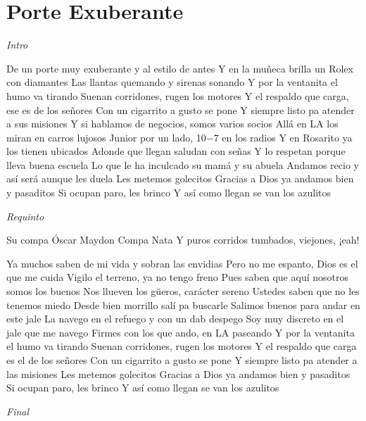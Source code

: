 \section{Porte Exuberante}

\noindent
\vspace{1cm}

\begin{guitar}
	\begin{multicols}{2}

		\textit{Intro}\par

De un porte muy exuberante y al estilo de antes
Y en la muñeca brilla un Rolex con diamantes
Las llantas quemando y sirenas sonando
Y por la ventanita el humo va tirando
Suenan corridones, rugen los motores
Y el respaldo que carga, ese es de los señores
Con un cigarrito a gusto se pone
Y siempre listo pa atender a sus misiones
Y si hablamos de negocios, somos varios socios
Allá en LA los miran en carros lujosos
Junior por un lado, 10$-$7 en los radios
Y en Rosarito ya los tienen ubicados
Adonde que llegan saludan con señas
Y lo respetan porque lleva buena escuela
Lo que le ha inculcado su mamá y su abuela
Andamos recio y así será aunque les duela
Les metemos golecitos
Gracias a Dios ya andamos bien y pasaditos
Si ocupan paro, les brinco
Y así como llegan se van los azulitos
\par
\textit{Requinto}
\par
Su compa Óscar Maydon
Compa Nata
Y puros corridos tumbados, viejones, ¡eah!

\par
Ya muchos saben de mi vida y sobran las envidias
Pero no me espanto, Dios es el que me cuida
Vigilo el terreno, ya no tengo freno
Pues saben que aquí nosotros somos los buenos
Nos llueven los güeros, carácter sereno
Ustedes saben que no les tenemos miedo
Desde bien morrillo salí pa buscarle
Salimos buenos para andar en este jale
La navego en el refuego y con un dab despego
Soy muy discreto en el jale que me navego
Firmes con los que ando, en LA paseando
Y por la ventanita el humo va tirando
Suenan corridones, rugen los motores
Y el respaldo que carga es el de los señores
Con un cigarrito a gusto se pone
Y siempre listo pa atender a las misiones
Les metemos golecitos
Gracias a Dios ya andamos bien y pasaditos
Si ocupan paro, les brinco
Y así como llegan se van los azulitos

\par

		\textit{Final}
\end{multicols}
\end{guitar}
